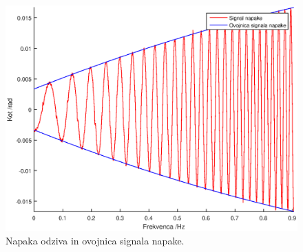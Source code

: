 \begin{figure}
	\centering
	\includegraphics[scale=0.5]{./Slike/follow_sine_err.eps}
	\caption{Napaka odziva in ovojnica signala napake.}
	\label{fig:follow_sine_err}
\end{figure}
